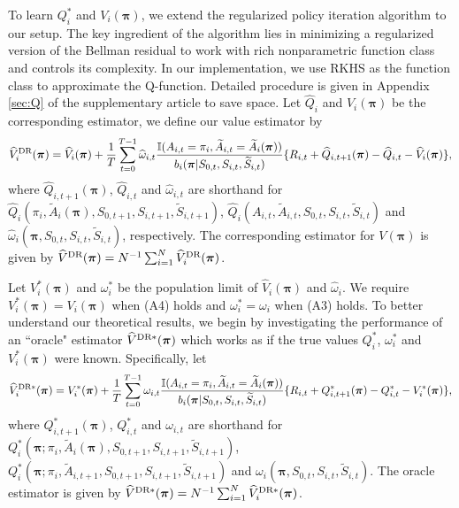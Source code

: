 \documentclass{article}
\begin{document}
To learn $Q_i^*$ and $V_i(\bm{\pi})$, we extend the regularized policy iteration algorithm \citep{Farah2016,liao2019off} to our setup.  The key ingredient of the algorithm lies in minimizing a regularized version of the Bellman residual to work with rich nonparametric function class and controls its complexity. In our implementation, we use RKHS as the function class to approximate the Q-function. Detailed procedure is given in Appendix \ref{sec:Q} of the supplementary article to save space. Let $\widehat{Q}_i$ and $\widehat{V}_i(\bm{\pi})$ be the corresponding estimator, we define our value estimator by
\begin{eqnarray*}
\widehat{V}^{\hbox{\scriptsize{DR}}}_i(\bm{\pi})=\widehat{V}_i(\bm{\pi})+\frac{1}{T}\sum_{t=0}^{T-1} \widehat{\omega}_{i,t}\frac{\mathbb{I}(A_{i,t}=\pi_i,\widetilde{A}_{i,t}=\widetilde{A}_i(\bm{\pi}))}{b_i(\bm{\pi}|S_{0,t},S_{i,t},\widetilde{S}_{i,t})}
 \{R_{i,t}+\widehat{Q}_{i,t+1}(\bm{\pi})-\widehat{Q}_{i,t}-\widehat{V}_i(\bm{\pi})\},
\end{eqnarray*}
where $\widehat{Q}_{i,t+1}(\bm{\pi})$, $\widehat{Q}_{i,t}$ and $\widehat{\omega}_{i,t}$ are shorthand for $\widehat{Q}_i(\pi_i,\widetilde{A}_i(\bm{\pi}),S_{0,t+1},S_{i,t+1},\widetilde{S}_{i,t+1})$, $\widehat{Q}_i(A_{i,t},\widetilde{A}_{i,t},S_{0,t},S_{i,t},\widetilde{S}_{i,t})$ and $\widehat{\omega}_i(\bm{\pi},S_{0,t},S_{i,t},\widetilde{S}_{i,t})$, respectively. The corresponding estimator for $V(\bm{\pi})$ is given by $\widehat{V}^{\hbox{\scriptsize{DR}}}(\bm{\pi})=N^{-1} \sum_{i=1}^N \widehat{V}^{\hbox{\scriptsize{DR}}}_i(\bm{\pi})$. 

Let $V_i^*(\bm{\pi})$ and $\omega_i^*$ be the population limit of $\widehat{V}_i(\bm{\pi})$ and $\widehat{\omega}_i$. We require $V_i^*(\bm{\pi})=V_i(\bm{\pi})$ when (A4) holds and $\omega_i^*=\omega_i$ when (A3) holds. To better understand our theoretical results, we begin by investigating the performance of an ``oracle" estimator $\widehat{V}^{\hbox{\scriptsize{DR}}*}(\bm{\pi})$ which works as if  the true values $Q_i^*$, $\omega_i^*$ and $V_i^*(\bm{\pi})$ were known. Specifically, let
\vspace{-0.1cm}
\begin{eqnarray*}
\widehat{V}_i^{\hbox{\scriptsize{DR}}*}(\bm{\pi})=V_i^*(\bm{\pi})+\frac{1}{T}\sum_{t=0}^{T-1} \omega_{i,t}\frac{\mathbb{I}(A_{i,t}=\pi_i,\widetilde{A}_{i,t}=\widetilde{A}_i(\bm{\pi}))}{b_i(\bm{\pi}|S_{0,t},S_{i,t},\widetilde{S}_{i,t})}
\{R_{i,t}+Q_{i,t+1}^*(\bm{\pi})-Q_{i,t}^*-V_i^*(\bm{\pi})\},
\end{eqnarray*}
where $Q_{i,t+1}^*(\bm{\pi})$, $Q_{i,t}^*$ and $\omega_{i,t}$ are shorthand for $Q_i^*(\bm{\pi};\pi_i,\widetilde{A}_{i}(\bm{\pi}),S_{0,t+1},S_{i,t+1},\widetilde{S}_{i,t+1})$, $Q_i^*(\bm{\pi};\pi_i,\widetilde{A}_{i,t+1},S_{0,t+1},S_{i,t+1},\widetilde{S}_{i,t+1})$ and  $\omega_i(\bm{\pi},S_{0,t},S_{i,t},\widetilde{S}_{i,t})$. The oracle estimator is given by $\widehat{V}^{\hbox{\scriptsize{DR}}*}(\bm{\pi})=N^{-1}\sum_{i=1}^N \widehat{V}_i^{\hbox{\scriptsize{DR}}*}(\bm{\pi})$. 
\end{document}
